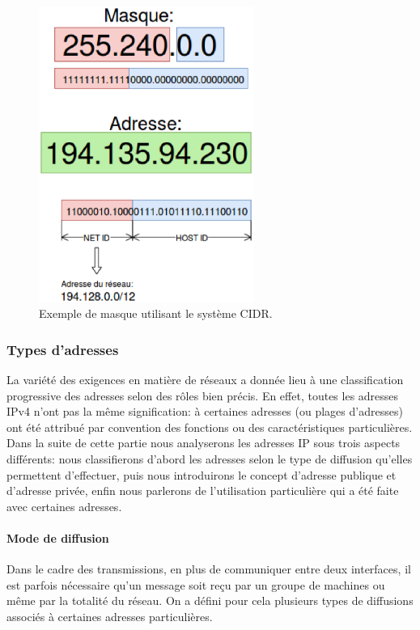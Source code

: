 \begin{figure}[h]
\centering
\includegraphics[width=7cm]{./pics/maskipv4cidr.eps}
\caption{Exemple de masque utilisant le système CIDR.}
\label{fig:exmask}
\end{figure}


\subsubsection{Types d'adresses}
La variété des exigences en matière de réseaux a donnée lieu à une
classification progressive des adresses selon des rôles bien précis. En effet,
toutes les adresses IPv4 n'ont pas la même signification: à certaines adresses
(ou plages d'adresses) ont été attribué par convention des fonctions ou des
caractéristiques particulières.  Dans la suite de cette partie nous analyserons les
adresses IP sous trois aspects différents: nous classifierons d'abord les adresses selon
le type de diffusion qu'elles permettent d'effectuer, puis nous introduirons le
concept d'adresse publique et d'adresse privée, enfin nous parlerons de l'utilisation
particulière qui a été faite avec certaines adresses.



\paragraph{Mode de diffusion}
Dans le cadre des transmissions, en plus de communiquer entre deux interfaces,
il est parfois nécessaire qu'un message soit reçu par un groupe de machines ou
même par la totalité du réseau.  On a défini pour cela
plusieurs types de diffusions associés à certaines adresses particulières.

